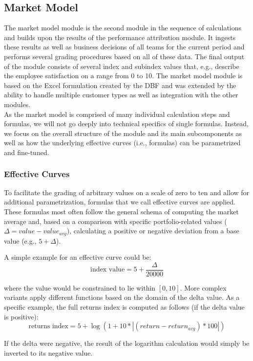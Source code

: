 \subsection{Market Model}
The market model module is the second module in the sequence of calculations and builds upon the results of the performance attribution module. It ingests these results as well as business decisions of all teams for the current period and performs several grading procedures based on all of these data. The final output of the module consists of several index and subindex values that, e.g., describe the employee satisfaction on a range from 0 to 10. The market model module is based on the Excel formulation created by the DBF and was extended by the ability to handle multiple customer types as well as integration with the other modules.\\

As the market model is comprised of many individual calculation steps and formulas, we will not go deeply into technical specifics of single formulas. Instead, we focus on the overall structure of the module and its main subcomponents as well as how the underlying effective curves (i.e., formulas) can be parametrized and fine-tuned.

\subsubsection{Effective Curves}
To facilitate the grading of arbitrary values on a scale of zero to ten and allow for additional parametrization, formulas that we call effective curves are applied. These formulas most often follow the general schema of computing the market average and, based on a comparison with specific portfolio-related values (\(\Delta = value - value_{avg}\)), calculating a positive or negative deviation from a base value (e.g., \(5 + \Delta \)).

A simple example for an effective curve could be:
\[\text{index value} = 5 + \frac{\Delta}{20000}\]

where the value would be constrained to lie within \([0, 10]\). More complex variants apply different functions based on the domain of the delta value. As a specific example, the full returns index is computed as follows (if the delta value is positive):
\[\text{returns index} = 5 + \log(1 + 10 * |(return - return_{avg}) * 100|)\]

If the delta were negative, the result of the logarithm calculation would simply be inverted to its negative value.

